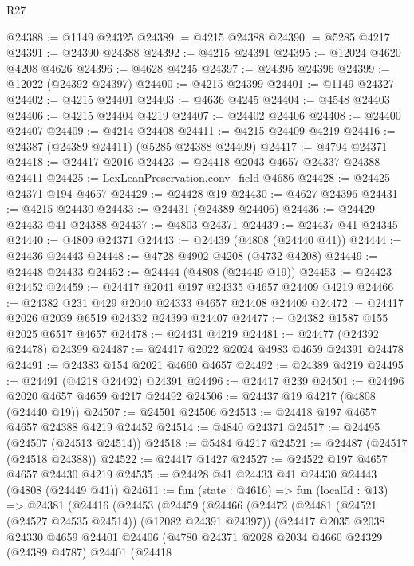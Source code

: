 \begin{lexlean}{R27}
\begin{coremodule}
@24388 := @1149 @24325
@24389 := @4215 @24388
@24390 := @5285 @4217
@24391 := @24390 @24388
@24392 := @4215 @24391
@24395 := @12024 @4620 @4208 @4626
@24396 := @4628 @4245
@24397 := @24395 @24396
@24399 := @12022 (@24392 @24397)
@24400 := @4215 @24399
@24401 := @1149 @24327
@24402 := @4215 @24401
@24403 := @4636 @4245
@24404 := @4548 @24403
@24406 := @4215 @24404 @4219
@24407 := @24402 @24406
@24408 := @24400 @24407
@24409 := @4214 @24408
@24411 := @4215 @24409 @4219
@24416 := @24387 (@24389 @24411) (@5285 @24388 @24409)
@24417 := @4794 @24371
@24418 := @24417 @2016
@24423 := @24418 @2043 @4657 @24337 @24388 @24411
@24425 := LexLeanPreservation.conv_field @4686
@24428 := @24425 @24371 @194 @4657
@24429 := @24428 @19
@24430 := @4627 @24396
@24431 := @4215 @24430
@24433 := @24431 (@24389 @24406)
@24436 := @24429 @24433 @41 @24388
@24437 := @4803 @24371
@24439 := @24437 @41 @24345
@24440 := @4809 @24371
@24443 := @24439 (@4808 (@24440 @41))
@24444 := @24436 @24443
@24448 := @4728 @4902 @4208 (@4732 @4208)
@24449 := @24448 @24433
@24452 := @24444 (@4808 (@24449 @19))
@24453 := @24423 @24452
@24459 := @24417 @2041 @197 @24335 @4657 @24409 @4219
@24466 := @24382 @231 @429 @2040 @24333 @4657 @24408 @24409
@24472 := @24417 @2026 @2039 @6519 @24332 @24399 @24407
@24477 := @24382 @1587 @155 @2025 @6517 @4657
@24478 := @24431 @4219
@24481 := @24477 (@24392 @24478) @24399
@24487 := @24417 @2022 @2024 @4983 @4659 @24391 @24478
@24491 := @24383 @154 @2021 @4660 @4657
@24492 := @24389 @4219
@24495 := @24491 (@4218 @24492) @24391
@24496 := @24417 @239
@24501 := @24496 @2020 @4657 @4659 @4217 @24492
@24506 := @24437 @19 @4217 (@4808 (@24440 @19))
@24507 := @24501 @24506
@24513 := @24418 @197 @4657 @4657 @24388 @4219 @24452
@24514 := @4840 @24371
@24517 := @24495 (@24507 (@24513 @24514))
@24518 := @5484 @4217
@24521 := @24487 (@24517 (@24518 @24388))
@24522 := @24417 @1427
@24527 := @24522 @197 @4657 @4657 @24430 @4219
@24535 := @24428 @41 @24433 @41 @24430 @24443 (@4808 (@24449 @41))
@24611 := fun (state : @4616) =>
  fun (localId : @13) =>
  @24381
    (@24416
      (@24453
        (@24459
          (@24466
            (@24472
              (@24481 (@24521 (@24527 @24535 @24514)) (@12082 @24391 @24397))
              (@24417
                @2035
                @2038
                @24330
                @4659
                @24401
                @24406
                (@4780
                  @24371
                  @2028
                  @2034
                  @4660
                  @24329
                  (@24389 @4787)
                  @24401
                  (@24418

\end{coremodule}
\end{lexlean}
